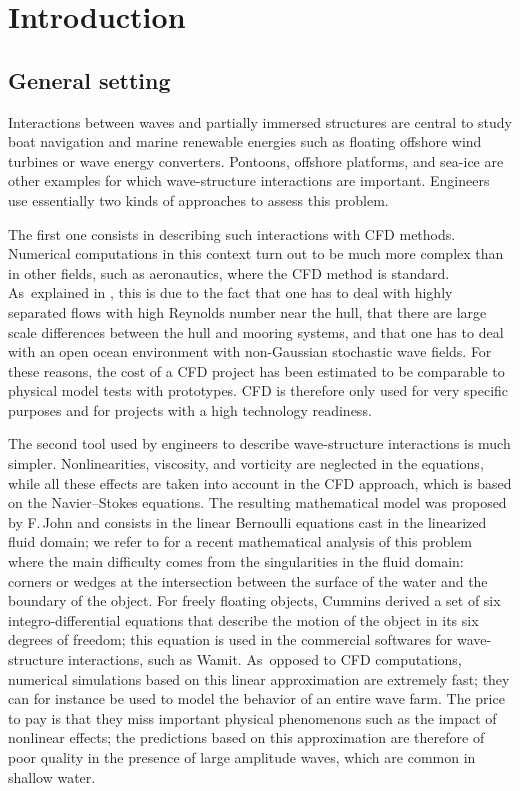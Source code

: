 \section{Introduction}
\subsection{General setting}
Interactions between waves and partially immersed structures are central to study boat navigation and marine renewable energies
such as floating offshore wind turbines or wave energy converters.
Pontoons, offshore platforms, and sea-ice are other examples for which wave-structure interactions are important.
Engineers use essentially two kinds of approaches to assess this problem.

The first one consists in describing such interactions with CFD methods.
Numerical computations in this context turn out to be much more complex than in other fields, such as aeronautics, where the CFD method is standard. As~explained in \cite{Kim}, this is due to the fact that one has to deal with highly separated flows with high Reynolds number near the hull,
that there are large scale differences between the hull and mooring systems,
and that one has to deal with an open ocean environment with non-Gaussian stochastic wave fields.
For these reasons, the cost of a CFD project has been estimated to be comparable to physical model tests with prototypes.
CFD is therefore only used for very specific purposes and for projects with a high technology readiness.

The second tool used by engineers to describe wave-structure interactions is much simpler.
Nonlinearities, viscosity, and vorticity are neglected in the equations,
while all these effects are taken into account in the CFD approach, which is based on the Navier--Stokes equations.
The resulting mathematical model was proposed by F.\,John \cite{John1,John2} and consists in the linear Bernoulli equations cast in the linearized fluid domain;
we refer to \cite{LannesMing} for a recent mathematical analysis of this problem where the main difficulty comes from the singularities in the fluid domain:
corners or wedges at the intersection between the surface of the water and the boundary of the object.
For freely floating objects, Cummins \cite{Cummins} derived a set of six integro-differential equations
that describe the motion of the object in its six degrees of freedom;
this equation is used in the commercial softwares for wave-structure interactions, such as Wamit. As~opposed to CFD computations, numerical simulations based on this linear approximation are extremely fast;
they can for instance be used to model the behavior of an entire wave farm.
The price to pay is that they miss important physical phenomenons such as the impact of nonlinear effects;
the predictions based on this approximation are therefore of poor quality in the presence of large amplitude waves, which are common in shallow water.

